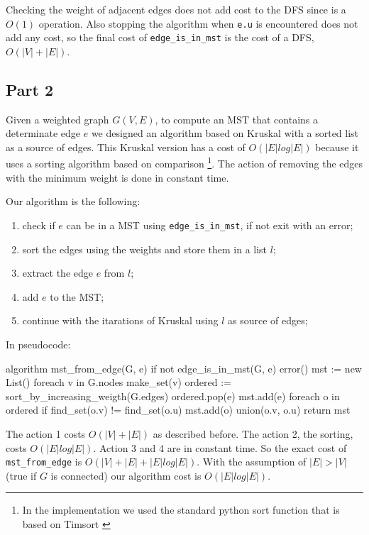 \documentclass[paper=a4, fontsize=11pt]{scrartcl} %
\numberwithin{equation}{section} %
\numberwithin{figure}{section} %
\numberwithin{table}{section} %
\begin{document}
Checking the weight of adjacent edges does not add cost to the DFS since is a $O(1)$ operation. Also stopping the algorithm when \verb|e.u| is encountered does not add any cost, so the final cost of \verb|edge_is_in_mst| is the cost of a DFS, $O(|V|+|E|)$.

\subsection*{Part 2}

Given a weighted graph $G(V, E)$, to compute an MST that contains a determinate edge $e$ we designed an algorithm based on Kruskal with a sorted list as a source of edges.
This Kruskal version has a cost of $O(|E|log|E|)$ because it uses a sorting algorithm based on comparison \footnote{In the implementation we used the standard python sort function that is based on Timsort \cite{timsort}}. The action of removing the edges with the minimum weight is done in constant time.

Our algorithm is the following:

\begin{enumerate}
    \item check if $e$ can be in a MST using \verb|edge_is_in_mst|, if not exit with an error;
    \item sort the edges using the weights and store them in a list $l$;
    \item extract the edge $e$ from $l$;
    \item add $e$ to the MST;
    \item continue with the itarations of Kruskal using $l$ as source of edges;
\end{enumerate}

In pseudocode:

\begin{pseudo}
algorithm mst_from_edge(G, e)
    if not edge_is_in_mst(G, e)
        error()
    mst := new List()
    foreach v in G.nodes
        make_set(v)
    ordered := sort_by_increasing_weigth(G.edges)
    ordered.pop(e)
    mst.add(e)
    foreach o in ordered
        if find_set(o.v) != find_set(o.u)
            mst.add(o)
            union(o.v, o.u)
    return mst
\end{pseudo}

The action 1 costs $O(|V|+|E|)$ as described before.
The action 2, the sorting, costs $O(|E|log|E|)$.
Action 3 and 4 are in constant time.
So the exact cost of \verb|mst_from_edge| is $O(|V|+|E| + |E|log|E|)$.
With the assumption of $|E| > |V|$ (true if $G$ is connected)  our algorithm cost is $O(|E|log|E|)$.
\end{document}
